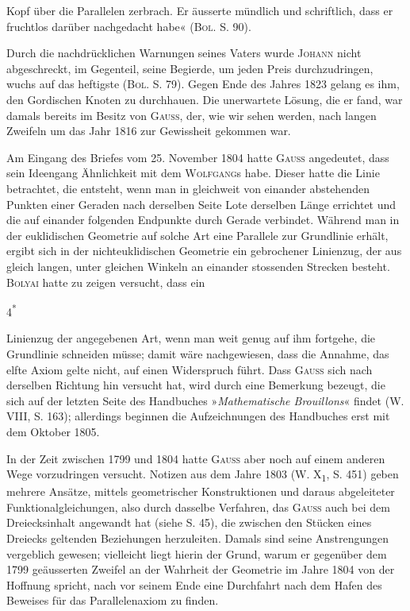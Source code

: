 Kopf über die Parallelen zerbrach. Er äusserte mündlich und schriftlich, dass
er fruchtlos darüber nachgedacht habe« (\textsc{Bol.} S. 90).
\par
Durch die nachdrücklichen Warnungen seines Vaters wurde \textsc{Johann} nicht
abgeschreckt, im Gegenteil, seine Begierde, um jeden Preis durchzudringen,
wuchs auf das heftigste (\textsc{Bol.} S. 79). Gegen Ende des Jahres 1823 gelang es
ihm, den Gordischen Knoten zu durchhauen. Die unerwartete Lösung, die
er fand, war damals bereits im Besitz von \textsc{Gauss}, der, wie wir sehen werden,
nach langen Zweifeln um das Jahr 1816 zur Gewissheit gekommen war.
\par
Am Eingang des Briefes vom 25. November 1804 hatte \textsc{Gauss} angedeutet,
dass sein Ideengang Ähnlichkeit mit dem \textsc{Wolfgang}s habe. Dieser hatte die
Linie betrachtet, die entsteht, wenn man in gleichweit von einander abstehenden
Punkten einer Geraden nach derselben Seite Lote derselben Länge
errichtet und die auf einander folgenden Endpunkte durch Gerade verbindet.
Während man in der euklidischen Geometrie auf solche Art eine Parallele
zur Grundlinie erhält, ergibt sich in der nichteuklidischen Geometrie ein gebrochener
Linienzug, der aus gleich langen, unter gleichen Winkeln an einander
stossenden Strecken besteht. \textsc{Bolyai} hatte zu zeigen versucht, dass ein
\par\vfill\hfill{\footnotesize 4\textsuperscript{*}}\par
\clearpage{}
\noindent Linienzug der angegebenen Art, wenn man weit genug auf ihm fortgehe, die
Grundlinie schneiden müsse; damit wäre nachgewiesen, dass die Annahme,
das elfte Axiom gelte nicht, auf einen Widerspruch führt. Dass \textsc{Gauss} sich
nach derselben Richtung hin versucht hat, wird durch eine Bemerkung bezeugt,
die sich auf der letzten Seite des Handbuches »\textit{Mathematische Brouillons}«
findet (W. VIII, S. 163); allerdings beginnen die Aufzeichnungen des Handbuches
erst mit dem Oktober 1805.
\par
In der Zeit zwischen 1799 und 1804 hatte \textsc{Gauss} aber noch auf einem
anderen Wege vorzudringen versucht. Notizen aus dem Jahre 1803 (W. X\textsubscript{1},
S. 451) geben mehrere Ansätze, mittels geometrischer Konstruktionen und
daraus abgeleiteter Funktionalgleichungen, also durch dasselbe Verfahren, das
\textsc{Gauss} auch bei dem Dreiecksinhalt angewandt hat (siehe S. 45), die zwischen
den Stücken eines Dreiecks geltenden Beziehungen herzuleiten. Damals sind
seine Anstrengungen vergeblich gewesen; vielleicht liegt hierin der Grund,
warum er gegenüber dem 1799 geäusserten Zweifel an der Wahrheit der Geometrie
im Jahre 1804 von der Hoffnung spricht, nach vor seinem Ende eine
Durchfahrt nach dem Hafen des Beweises für das Parallelenaxiom zu finden.
\clearpage\endgroup

